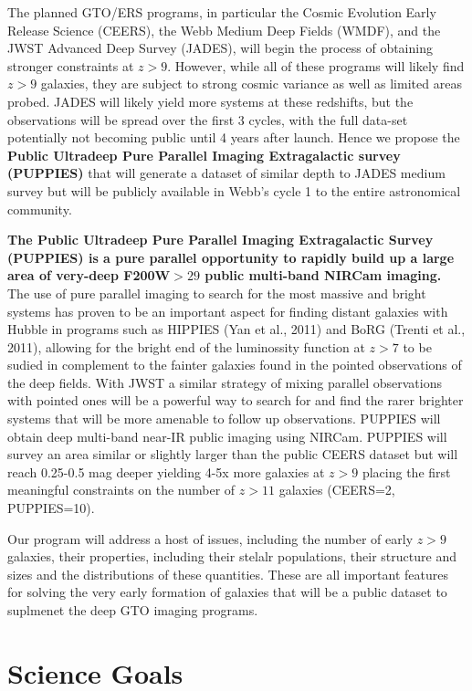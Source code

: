 \documentclass[12pt]{article}
\begin{document}
The planned GTO/ERS programs, in particular the Cosmic Evolution Early Release Science (CEERS), the Webb Medium Deep Fields (WMDF), and the JWST Advanced Deep Survey (JADES), will begin the process of obtaining stronger constraints at $z>9$.   However, while all of these programs will likely find $z > 9$ galaxies, they are subject to strong cosmic variance as well as limited areas probed.  JADES will likely yield more systems at these redshifts, but the observations will be spread over the first 3 cycles, with the full data-set potentially not becoming public until 4 years after launch. Hence we propose the \textbf{Public Ultradeep Pure Parallel Imaging Extragalactic survey (PUPPIES)} that will generate a dataset of similar depth to JADES medium survey but will be publicly available in Webb's cycle 1 to the entire astronomical community. 


{\bf The Public Ultradeep Pure Parallel Imaging Extragalactic Survey (PUPPIES) is a pure parallel opportunity to rapidly build up a large area of very-deep F200W$>29$ public multi-band NIRCam imaging.}  The use of pure parallel imaging to search for the most massive and bright systems has proven to be an important aspect for finding distant galaxies with Hubble in programs such as HIPPIES (Yan et al., 2011) and BoRG (Trenti et al., 2011), allowing for the bright end of the luminossity function at $z > 7$ to be sudied in complement to the fainter galaxies found in the pointed observations of the deep fields.  With JWST a similar strategy of mixing parallel observations with pointed ones will be a powerful way to search for and find the rarer brighter systems that will be more amenable to follow up observations.   PUPPIES will obtain deep multi-band near-IR public imaging using NIRCam. PUPPIES will survey an area similar or slightly larger than the public CEERS dataset but will reach 0.25-0.5 mag deeper yielding 4-5x more galaxies at $z > 9$ placing the first meaningful constraints on the number of $z > 11$ galaxies (CEERS=2, PUPPIES=10).

Our program will address a host of issues, including the number of early $z > 9$ galaxies, their properties, including their stelalr populations, their structure and sizes and the distributions of these quantities.  These are all important features for solving the very early formation of galaxies that will be a public dataset to suplmenet the deep GTO imaging programs.

\section{Science Goals}
\end{document}
